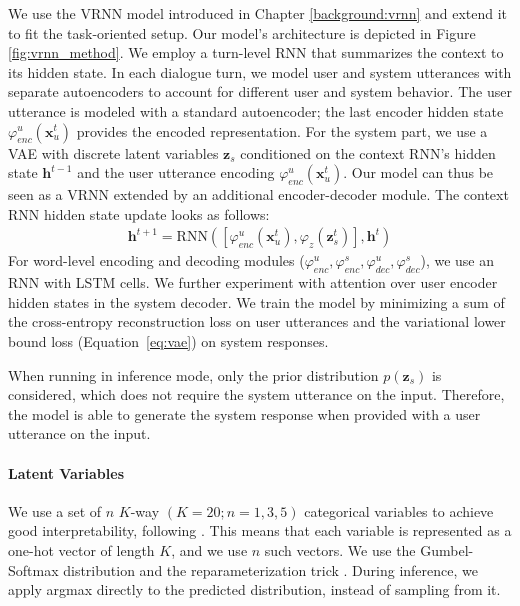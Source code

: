 We use the VRNN model introduced in Chapter \ref{background:vrnn} and extend it to fit the task-oriented setup.
Our model's architecture is depicted in Figure \ref{fig:vrnn_method}.
We employ a turn-level RNN that summarizes the context to its hidden state.
In each dialogue turn, we model user and system utterances with separate autoencoders to account for different user and system behavior.
The user utterance is modeled with a standard autoencoder; the last encoder hidden state $\varphi^u_{enc}(\mathbf{x}^t_u)$ provides the encoded representation.
For the system part, we use a VAE with discrete latent variables $\textbf{z}_s$ conditioned on the context RNN's hidden state $\mathbf{h}^{t-1}$ and the user utterance encoding $\varphi^u_{enc}(\mathbf{x}^t_u)$.
Our model can thus be seen as a VRNN extended by an additional encoder-decoder module.
The context RNN hidden state update looks as follows:
\begin{equation}
    \begin{gathered}
        \mathbf{h}^{t+1} = \text{RNN}([\varphi^u_{enc}(\mathbf{x}_u^t),\varphi_{z}(\mathbf{z}^t_s)], \mathbf{h}^t)
    \end{gathered}
\end{equation}
For word-level encoding and decoding modules ($\varphi_{enc}^u,\varphi_{enc}^s,\varphi_{dec}^u,\varphi_{dec}^s$), we use an RNN with LSTM cells.
We further experiment with attention \cite{bahdanau2014neural} over user encoder hidden states in the system decoder.
We train the model by minimizing a sum of the cross-entropy reconstruction loss on user utterances and the variational lower bound loss (Equation~\ref{eq:vae}) on system responses.

When running in inference mode, only the prior distribution $p(\mathbf{z}_s)$ is considered, which does not require the system utterance on the input.
Therefore, the model is able to generate the system response when provided with a user utterance on the input.

\paragraph{Latent Variables}
\label{sec:method_latent}
We use a set of $n$ \mbox{$K$-way} $(K=20;n=1,3,5)$ categorical variables to achieve good interpretability, following \citet{zhao2018unsupervised}.
This means that each variable is represented as a one-hot vector of length $K$, and we use $n$ such vectors.
We use the Gumbel-Softmax distribution and the reparameterization trick \cite{jang2017categorical}.
During inference, we apply argmax directly to the predicted distribution, instead of sampling from it.

